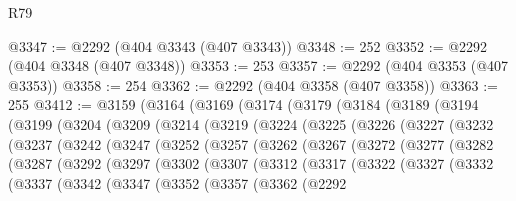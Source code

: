 \begin{lexlean}{R79}
\begin{coremodule}
@3347 := @2292 (@404 @3343 (@407 @3343))
@3348 := 252
@3352 := @2292 (@404 @3348 (@407 @3348))
@3353 := 253
@3357 := @2292 (@404 @3353 (@407 @3353))
@3358 := 254
@3362 := @2292 (@404 @3358 (@407 @3358))
@3363 := 255
@3412 := @3159
    (@3164
      (@3169
        (@3174
          (@3179
            (@3184
              (@3189
                (@3194
                  (@3199
                    (@3204
                      (@3209
                        (@3214
                          (@3219
                            (@3224
                              (@3225
                                (@3226
                                  (@3227
                                    (@3232
                                      (@3237
                                        (@3242
                                          (@3247
                                            (@3252
                                              (@3257
                                                (@3262
                                                  (@3267
                                                    (@3272
                                                      (@3277
                                                        (@3282
                                                          (@3287
                                                            (@3292
                                                              (@3297
                                                                (@3302
                                                                  (@3307
                                                                    (@3312
                                                                      (@3317
                                                                        (@3322
                                                                          (@3327
                                                                            (@3332
                                                                              (@3337
                                                                                (@3342
                                                                                  (@3347
                                                                                    (@3352
                                                                                      (@3357
                                                                                        (@3362
                                                                                          (@2292

\end{coremodule}
\end{lexlean}
